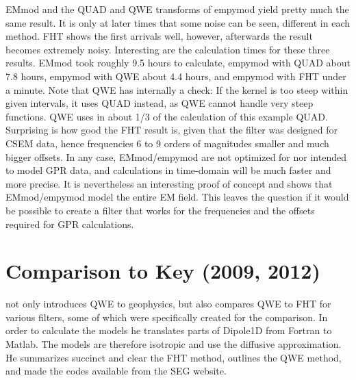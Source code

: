 \documentclass[paper]{geophysics}
\begin{document}
EMmod and the QUAD and QWE transforms of empymod yield pretty much the same
result. It is only at later times that some noise can be seen, different in
each method. FHT shows the first arrivals well, however, afterwards the result
becomes extremely noisy.
%
%
Interesting are the calculation times for these three results. EMmod took
roughly 9.5 hours to calculate, empymod with QUAD about 7.8 hours, empymod with
QWE about 4.4 hours, and empymod with FHT under a minute. Note that QWE has
internally a check: If the kernel is too steep within given intervals, it uses
QUAD instead, as QWE cannot handle very steep functions. QWE uses in about 1/3
of the calculation of this example QUAD. Surprising is how good the FHT result
is, given that the filter was designed for CSEM data, hence frequencies 6 to 9
orders of magnitudes smaller and much bigger offsets. In any case,
EMmod/empymod are not optimized for nor intended to model GPR data, and
calculations in time-domain will be much faster and more precise. It is
nevertheless an interesting proof of concept and shows that EMmod/empymod model
the entire EM field. This leaves the question if it would be possible to
create a filter that works for the frequencies and the offsets required for GPR
calculations.



\section{Comparison to Key (2009, 2012)}

\cite{GEO.12.Key} not only introduces QWE to geophysics, but also compares QWE
to FHT for various filters, some of which were specifically created for the
comparison. In order to calculate the models he translates parts of Dipole1D
\citep{GEO.09.Key} from Fortran to Matlab. The models are therefore isotropic
and use the diffusive approximation. He summarizes succinct and clear the FHT
method, outlines the QWE method, and made the codes available from the SEG
website.
\end{document}
